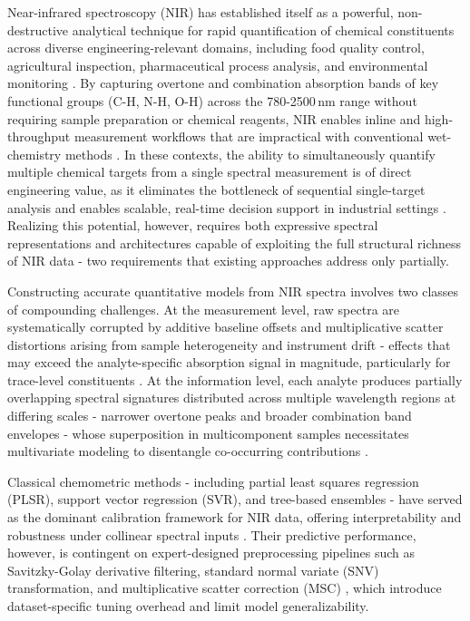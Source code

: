 \documentclass[pdflatex,sn-mathphys-num]{sn-jnl}%
\begin{document}
Near-infrared spectroscopy (NIR) has established itself as a powerful, non-destructive analytical technique for rapid quantification of chemical constituents across diverse engineering-relevant domains, including food quality control, agricultural inspection, pharmaceutical process analysis, and environmental monitoring \cite{tirado2026review,shan2025uda,wang2025nirs,cozzolino2023advantages,wohlers2025stability}. By capturing overtone and combination absorption bands of key functional groups (C-H, N-H, O-H) across the 780-2500\,nm range without requiring sample preparation or chemical reagents, NIR enables inline and high-throughput measurement workflows that are impractical with conventional wet-chemistry methods \cite{Chu2022Chemometric,bec2022silico}. In these contexts, the ability to simultaneously quantify multiple chemical targets from a single spectral measurement is of direct engineering value, as it eliminates the bottleneck of sequential single-target analysis and enables scalable, real-time decision support in industrial settings  \cite{junior2020multi,MISHRA2022111741,cheng2023semisupervised}. Realizing this potential, however, requires both expressive spectral representations and architectures capable of exploiting the full structural richness of NIR data - two requirements that existing approaches address only partially.

Constructing accurate quantitative models from NIR spectra involves two classes of compounding challenges. At the measurement level, raw spectra are systematically corrupted by additive baseline offsets and multiplicative scatter distortions arising from sample heterogeneity and instrument drift - effects that may exceed the analyte-specific absorption signal in magnitude, particularly for trace-level constituents \cite{Chu2022Chemometric, yan2025review}. At the information level, each analyte produces partially overlapping spectral signatures distributed across multiple wavelength regions at differing scales - narrower overtone peaks and broader combination band envelopes - whose superposition in multicomponent samples necessitates multivariate modeling to disentangle co-occurring contributions \cite{NobariMultivariate, bec2022silico}.

Classical chemometric methods - including partial least squares regression (PLSR), support vector regression (SVR), and tree-based ensembles - have served as the dominant calibration framework for NIR data, offering interpretability and robustness under collinear spectral inputs \cite{zhang2022review,phan2025ebar,mishra2022deep,amirvaresi2023miniaturized,phuong2025advances,phuong2025nirmacnet}. Their predictive performance, however, is contingent on expert-designed preprocessing pipelines such as Savitzky-Golay derivative filtering, standard normal variate (SNV) transformation, and multiplicative scatter correction (MSC) \cite{NobariMultivariate,Chu2022Chemometric,yan2025review}, which introduce dataset-specific tuning overhead and limit model generalizability. 
\end{document}
